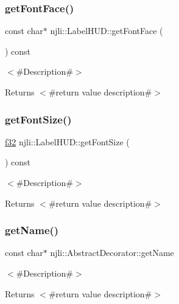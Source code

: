 \subsubsection{\texorpdfstring{get\+Font\+Face()}{getFontFace()}}
{\footnotesize\ttfamily const char$\ast$ njli\+::\+Label\+H\+U\+D\+::get\+Font\+Face (\begin{DoxyParamCaption}{ }\end{DoxyParamCaption}) const}

$<$\#\+Description\#$>$

\begin{DoxyReturn}{Returns}
$<$\#return value description\#$>$ 
\end{DoxyReturn}
\mbox{\label{classnjli_1_1_label_h_u_d_aee2bb7f6202c92a494beb15ff64048b2}} 
\subsubsection{\texorpdfstring{get\+Font\+Size()}{getFontSize()}}
{\footnotesize\ttfamily \mbox{\hyperlink{_util_8h_a5f6906312a689f27d70e9d086649d3fd}{f32}} njli\+::\+Label\+H\+U\+D\+::get\+Font\+Size (\begin{DoxyParamCaption}{ }\end{DoxyParamCaption}) const}

$<$\#\+Description\#$>$

\begin{DoxyReturn}{Returns}
$<$\#return value description\#$>$ 
\end{DoxyReturn}
\mbox{\label{classnjli_1_1_label_h_u_d_ad41266885be835f3ee602311e20877a4}} 
\subsubsection{\texorpdfstring{get\+Name()}{getName()}}
{\footnotesize\ttfamily const char$\ast$ njli\+::\+Abstract\+Decorator\+::get\+Name}

$<$\#\+Description\#$>$

\begin{DoxyReturn}{Returns}
$<$\#return value description\#$>$ 
\end{DoxyReturn}
\mbox{\label{classnjli_1_1_label_h_u_d_ac4ca71716ed832be357f15f8262c8448}} 
